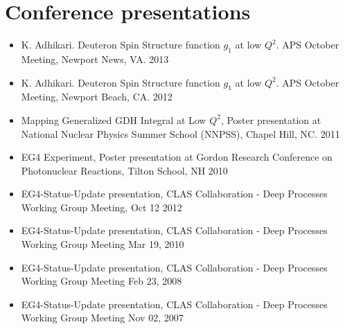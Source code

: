 \documentclass[10pt, letterpaper]{article}
\begin{document}
\section*{Conference presentations}
\noindent
\begin{itemize}
\item K. Adhikari.  Deuteron Spin Structure function $g_1$ at low $Q^2$. APS October Meeting, Newport News, VA.  \hfill  2013
\item K. Adhikari.  Deuteron Spin Structure function $g_1$ at low $Q^2$. APS October Meeting,   Newport Beach, CA. \hfill   2012
\item Mapping Generalized GDH Integral at Low $Q^2$, Poster presentation at National Nuclear Physics Summer School (NNPSS), Chapel Hill, NC. \hfill  2011 %
\item EG4 Experiment, Poster presentation at Gordon Research Conference on Photonuclear Reactions, Tilton School, NH \hfill   2010 %

\item EG4-Status-Update presentation, CLAS Collaboration - Deep Processes Working Group Meeting, Oct 12 \hfill    2012
\item EG4-Status-Update presentation, CLAS Collaboration - Deep Processes Working Group Meeting \hfill   Mar 19, 2010
\item EG4-Status-Update presentation, CLAS Collaboration - Deep Processes Working Group Meeting \hfill   Feb 23, 2008
\item EG4-Status-Update presentation, CLAS Collaboration - Deep Processes Working Group Meeting \hfill    Nov 02, 2007 


\end{itemize}
\end{document}
